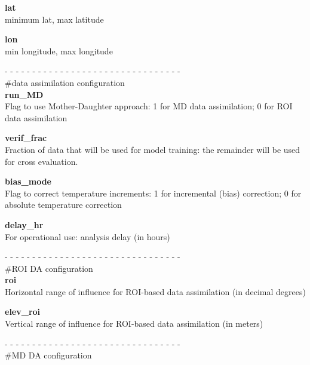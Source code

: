 \documentclass{article}
\begin{document}
\noindent \textbf{lat}\\
\lbrack minimum lat, max latitude\rbrack

\vspace{0.1cm}
\noindent \textbf{lon}\\
\lbrack min longitude, max longitude\rbrack


\vspace{0.5cm}
\noindent- - - - - - - - - - - - - - - - - - - - - - - - - - - - - - - -\\
\noindent\#data assimilation configuration\\

\noindent \textbf{run\_MD}\\
Flag to use Mother-Daughter approach: 1 for MD data assimilation; 0 for ROI data assimilation

\vspace{0.1cm}
\noindent \textbf{verif\_frac}\\
Fraction of data that will be used for model training: the remainder will be used for cross evaluation. 

\vspace{0.1cm}
\noindent \textbf{bias\_mode}\\
Flag to correct temperature increments: 1 for incremental (bias) correction; 0 for absolute temperature correction

\vspace{0.1cm}
\noindent \textbf{delay\_hr}\\
For operational use: analysis delay (in hours)

\vspace{0.5cm}
\noindent- - - - - - - - - - - - - - - - - - - - - - - - - - - - - - - -\\
\noindent\#ROI DA configuration\\

\noindent \textbf{roi}\\
Horizontal range of influence for ROI-based data assimilation (in decimal degrees)

\vspace{0.1cm}
\noindent \textbf{elev\_roi}\\
Vertical range of influence for ROI-based data assimilation (in meters)



\vspace{0.5cm}
\noindent- - - - - - - - - - - - - - - - - - - - - - - - - - - - - - - -\\
\noindent\#MD DA configuration\\
\end{document}
